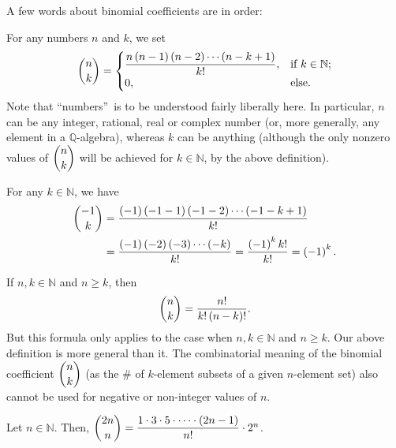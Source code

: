 A few words about binomial coefficients are in order:

\begin{definition}
\label{def.binom.binom}For any numbers $n$ and $k$, we set%
\begin{equation}
\dbinom{n}{k}=%
\begin{cases}
\dfrac{n\left(  n-1\right)  \left(  n-2\right)  \cdots\left(  n-k+1\right)
}{k!}, & \text{if }k\in\mathbb{N};\\
0, & \text{else.}%
\end{cases}
\label{eq.def.binom.binom.eq}%
\end{equation}
Note that \textquotedblleft numbers\textquotedblright\ is to be understood
fairly liberally here. In particular, $n$ can be any integer, rational, real
or complex number (or, more generally, any element in a $\mathbb{Q}$-algebra),
whereas $k$ can be anything (although the only nonzero values of $\dbinom
{n}{k}$ will be achieved for $k\in\mathbb{N}$, by the above definition).
\end{definition}

\begin{example}
\label{exa.binom.-1choosek}For any $k\in\mathbb{N}$, we have
\begin{align*}
\dbinom{-1}{k}  &  =\dfrac{\left(  -1\right)  \left(  -1-1\right)  \left(
-1-2\right)  \cdots\left(  -1-k+1\right)  }{k!}\\
&  =\dfrac{\left(  -1\right)  \left(  -2\right)  \left(  -3\right)
\cdots\left(  -k\right)  }{k!}=\dfrac{\left(  -1\right)  ^{k}k!}{k!}=\left(
-1\right)  ^{k}.
\end{align*}

\end{example}

If $n,k\in\mathbb{N}$ and $n\geq k$, then
\begin{equation}
\dbinom{n}{k}=\dfrac{n!}{k!\left(  n-k\right)  !}. \label{eq.binom.fac-form}%
\end{equation}
But this formula only applies to the case when $n,k\in\mathbb{N}$ and $n\geq
k$. Our above definition is more general than it. The combinatorial meaning of
the binomial coefficient $\dbinom{n}{k}$ (as the \# of $k$-element subsets of
a given $n$-element set) also cannot be used for negative or non-integer
values of $n$.

\begin{example}
\label{exa.binom.2n-choose-n}Let $n\in\mathbb{N}$. Then, $\dbinom{2n}%
{n}=\dfrac{1\cdot3\cdot5\cdot\cdots\cdot\left(  2n-1\right)  }{n!}\cdot2^{n}$.
\end{example}

